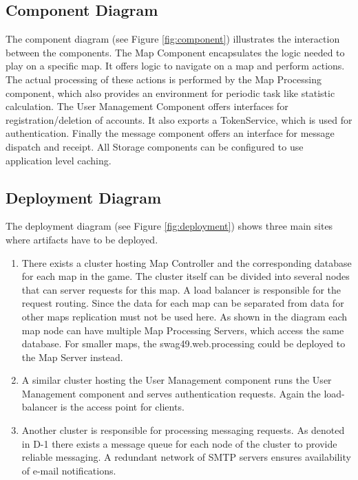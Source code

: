 \documentclass[11pt]{article}
\begin{document}
\subsection{Component Diagram}

The component diagram (see Figure \ref{fig:component}) illustrates the interaction between the components. The Map Component encapsulates the logic needed to play on a specific map. It offers logic to navigate on a map and perform actions. The actual processing of these actions is performed by the Map Processing component, which also provides an environment for periodic task like statistic calculation. The User Management Component offers interfaces for registration/deletion of accounts. It also exports a TokenService, which is used for authentication. Finally the message component offers an interface for message dispatch and receipt. All Storage components can be configured to use application level caching.

\subsection{Deployment Diagram}

The deployment diagram (see Figure \ref{fig:deployment})  shows three main sites where artifacts have to be deployed.
\begin{enumerate}
\item There exists a cluster hosting Map Controller and the corresponding database for each map in the game. The cluster itself can be divided into several nodes that can server requests for this map. A load balancer is responsible for the request routing. Since the data for each map can be separated from data for other maps replication must not be used here. As shown in the diagram each map node can have multiple Map Processing Servers, which access the same database. For smaller maps, the swag49.web.processing could be deployed to the Map Server instead.
\item A similar cluster hosting the User Management component runs the User Management component and  serves authentication requests. Again the load-balancer is the access point for clients.
\item Another cluster is responsible for processing messaging requests. As denoted in D-1 there exists a message queue for each node of the cluster to provide reliable messaging. A redundant network of SMTP servers ensures availability of e-mail notifications.
\end{enumerate}
\end{document}
